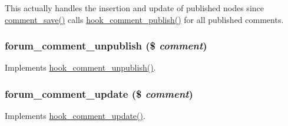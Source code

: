 This actually handles the insertion and update of published nodes since \hyperlink{comment_8module_a4ef5d3d2161511e0d09a560fb5004e82}{comment\_\-save()} calls \hyperlink{group__hooks_ga4c4be9019e5cc7f92e8ccc03b595a64b}{hook\_\-comment\_\-publish()} for all published comments. \hypertarget{forum_8module_a11843a3a30fb748c618574333f6dd76d}{
\subsubsection[{forum\_\-comment\_\-unpublish}]{\setlength{\rightskip}{0pt plus 5cm}forum\_\-comment\_\-unpublish (\$ {\em comment})}}
\label{forum_8module_a11843a3a30fb748c618574333f6dd76d}
Implements \hyperlink{group__hooks_gaed97e1a1eaedd7b482f881ea2b8a3876}{hook\_\-comment\_\-unpublish()}. \hypertarget{forum_8module_a9208eaf8d6370b602b9f4e11e3ed4e27}{
\subsubsection[{forum\_\-comment\_\-update}]{\setlength{\rightskip}{0pt plus 5cm}forum\_\-comment\_\-update (\$ {\em comment})}}
\label{forum_8module_a9208eaf8d6370b602b9f4e11e3ed4e27}
Implements \hyperlink{group__hooks_ga63e0b41e7dbaadbf352b0a9c246d5ae5}{hook\_\-comment\_\-update()}.

